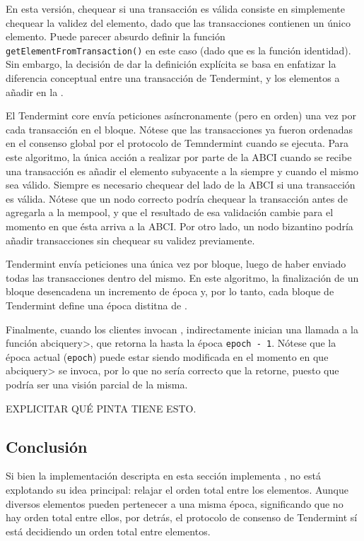 En esta versión, chequear si una transacción es válida consiste en simplemente chequear
la validez del elemento, dado que las transacciones contienen un único elemento.
%
Puede parecer absurdo definir la función \texttt{getElementFromTransaction()}
en este caso (dado que es la función identidad). Sin embargo, la decisión de dar
la definición explícita se basa en enfatizar la diferencia conceptual entre una
transacción de Tendermint, y los elementos a añadir en la \setchain.
%

El Tendermint core envía peticiones \DeliverTx asíncronamente (pero en orden)
una vez por cada transacción en el bloque.
%
Nótese que las transacciones ya fueron ordenadas en el consenso global por el protocolo
de Temndermint cuando \DeliverTx se ejecuta.
%
Para este algoritmo, la única acción a realizar por parte de la ABCI cuando se recibe una
transacción es añadir el elemento subyacente a la \setchain siempre y cuando el mismo
sea válido.
%
Siempre es necesario chequear del lado de la ABCI si una transacción es válida.
%
Nótese que un nodo correcto podría chequear la transacción antes de agregarla a la
mempool,
y que el resultado de esa validación cambie para el momento en que ésta arriva a la
ABCI.
%
Por otro lado, un nodo bizantino podría añadir transacciones sin chequear
su validez previamente.
%

Tendermint envía peticiones \EndBlock una única vez por bloque, luego de haber
enviado todas las transacciones dentro del mismo.
%
En este algoritmo, la finalización de un bloque desencadena un incremento de época
y, por lo tanto, cada bloque de Tendermint define una época distitna de \setchain.
%

Finalmente, cuando los clientes invocan \Get, indirectamente inician una llamada
a la función \<abciquery>, que retorna la \setchain hasta la época \texttt{epoch - 1}.
Nótese que la época actual (\texttt{epoch}) puede estar siendo modificada en el momento
en que \<abciquery> se invoca, por lo que no sería correcto que \Get la retorne, puesto que
podría ser una visión parcial de la misma. 

EXPLICITAR QUÉ PINTA TIENE ESTO.

\subsection{Conclusión}
Si bien la implementación descripta en esta sección implementa \setchain, no está explotando su idea
principal: relajar el orden total entre los elementos.
%
Aunque diversos elementos pueden pertenecer a una misma época, significando que no hay orden total
entre ellos, por detrás, el protocolo de consenso de Tendermint sí está decidiendo un orden total
entre elementos.
%
%

